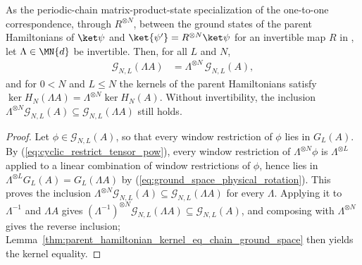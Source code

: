 \begin{lemma}\label{thm:chain_ground_space_physical_rotation}
    \leanok
    As the periodic-chain matrix-product-state specialization of the one-to-one
    correspondence, through $R^{\otimes N}$, between the ground states of the
    parent Hamiltonians of $\ket\psi$ and $\ket{\psi'}=R^{\otimes N}\ket\psi$
    for an invertible map $R$ in \cite[Section~IV.C]{Cirac2021Matrix}, let
    $\Lambda\in\MN{d}$ be invertible. Then, for all $L$ and $N$,
    \begin{align}
        \mathcal G_{N,L}(\Lambda A) & =\Lambda^{\otimes N}\,\mathcal G_{N,L}(A),
        \label{eq:chain_ground_space_physical_rotation}
    \end{align}
    and for $0<N$ and $L\le N$ the kernels of the parent Hamiltonians satisfy
    $\ker H_N(\Lambda A)=\Lambda^{\otimes N}\ker H_N(A)$. Without
    invertibility, the inclusion
    $\Lambda^{\otimes N}\mathcal G_{N,L}(A)\subseteq\mathcal G_{N,L}(\Lambda A)$
    still holds.
\end{lemma}

\begin{proof}
    \leanok
    Let $\phi\in\mathcal G_{N,L}(A)$, so that every window restriction of $\phi$
    lies in $G_L(A)$. By (\ref{eq:cyclic_restrict_tensor_pow}), every window
    restriction of $\Lambda^{\otimes N}\phi$ is $\Lambda^{\otimes L}$ applied to a
    linear combination of window restrictions of $\phi$, hence lies in
    $\Lambda^{\otimes L}G_L(A)=G_L(\Lambda A)$ by
    (\ref{eq:ground_space_physical_rotation}). This proves the inclusion
    $\Lambda^{\otimes N}\mathcal G_{N,L}(A)\subseteq\mathcal G_{N,L}(\Lambda A)$
    for every $\Lambda$. Applying it to $\Lambda^{-1}$ and $\Lambda A$ gives
    $(\Lambda^{-1})^{\otimes N}\mathcal G_{N,L}(\Lambda A)\subseteq\mathcal G_{N,L}(A)$,
    and composing with $\Lambda^{\otimes N}$ gives the reverse inclusion;
    Lemma~\ref{thm:parent_hamiltonian_kernel_eq_chain_ground_space} then
    yields the kernel equality.
\end{proof}

